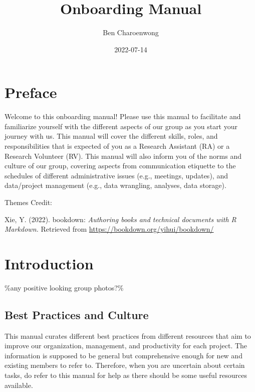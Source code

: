 \documentclass[
]{book}
\title{Onboarding Manual}
\author{Ben Charoenwong}
\date{2022-07-14}
\begin{document}
\maketitle

{
\setcounter{tocdepth}{1}
\tableofcontents
}
\hypertarget{preface}{%
\chapter*{\texorpdfstring{\textbf{Preface}}{Preface}}\label{preface}}

Welcome to this onboarding manual! Please use this manual to facilitate and familiarize yourself with the different aspects of our group as you start your journey with us. This manual will cover the different skills, roles, and responsibilities that is expected of you as a Research Assistant (RA) or a Research Volunteer (RV). This manual will also inform you of the norms and culture of our group, covering aspects from communication etiquette to the schedules of different administrative issues (e.g., meetings, updates), and data/project management (e.g., data wrangling, analyses, data storage).

Themes Credit:

Xie, Y. (2022). bookdown: \emph{Authoring books and technical documents with R Markdown.} Retrieved from \url{https://bookdown.org/yihui/bookdown/}

\hypertarget{introduction}{%
\chapter{\texorpdfstring{\textbf{Introduction}}{Introduction}}\label{introduction}}

\%any positive looking group photos?\%

\hypertarget{best-practices-and-culture}{%
\section{Best Practices and Culture}\label{best-practices-and-culture}}

This manual curates different best practices from different resources that aim to improve our organization, management, and productivity for each project. The information is supposed to be general but comprehensive enough for new and existing members to refer to. Therefore, when you are uncertain about certain tasks, do refer to this manual for help as there should be some useful resources available.
\end{document}
